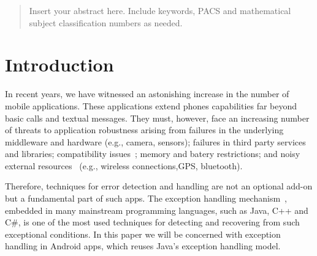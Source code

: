 \author{First Author         \and
        Second Author %
}



\date{Received: date / Accepted: date}


\maketitle

\begin{abstract}
Insert your abstract here. Include keywords, PACS and mathematical
subject classification numbers as needed.
\end{abstract}

\section{Introduction}
\label{intro}

In recent years, we have witnessed an astonishing increase in the number of
mobile applications. These applications extend phones capabilities 
far beyond basic calls and textual messages. They must, however,
face an increasing number of threats to application robustness
 arising from failures in the underlying middleware and hardware (e.g., camera, sensors);
failures in third party services and libraries; compatibility issues~\cite{McDon13}; 
 memory and batery restrictions; and noisy external resources~\cite{Zhang12} 
(e.g., wireless connections,GPS, bluetooth). 

Therefore, techniques for error detection and handling are not  an optional add-on but a 
fundamental part of such apps. The exception handling mechanism~\cite{goodenough1975exception},
embedded in many mainstream programming languages, such as Java, C++ and C\#,
 is one of the most used techniques for detecting and recovering from such exceptional conditions.
In this paper we will be concerned with exception handling in Android apps,
which reuses Java's exception handling model.
 
